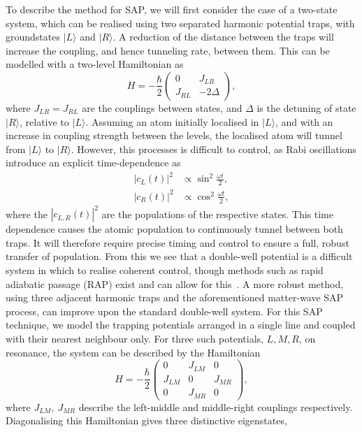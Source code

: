 To describe the method for SAP, we will first consider the case of a two-state system, which can be realised using two separated harmonic potential traps, with groundstates $| L \rangle$ and $| R \rangle$. A reduction of the distance between the traps will increase the coupling, and hence tunneling rate, between them. This can be modelled with a two-level Hamiltonian as
\begin{equation}
    H = -\frac{\hbar}{2}
    \begin{pmatrix}
        0 & J_{LR} \\
        J_{RL} & -2\Delta
    \end{pmatrix},
\end{equation}
where $J_{LR} = J_{RL}$ are the couplings between states, and $\Delta$ is the detuning of state $| R \rangle$, relative to $| L \rangle$. Assuming an atom initially localised in $| L \rangle$, and with an increase in coupling strength between the levels, the localised atom will tunnel from $| L \rangle$ to $| R \rangle $. However, this processes is difficult to control, as Rabi oscillations introduce an explicit time-dependence as
\begin{subequations}
\begin{align}
    |c_L(t)|^2 &\propto \sin^2 \frac{\omega t}{2} ,\\
    |c_R(t)|^2 &\propto \cos^2 \frac{\omega t}{2},
\end{align}
\end{subequations}
where the $|c_{L,R}(t)|^2$ are the populations of the respective states. This time dependence causes the atomic population to continuously tunnel between both traps. It will therefore require precise timing and control to ensure a full, robust transfer of population. From this we see that a double-well potential is a difficult system in which to realise coherent control, though methods such as rapid adiabatic passage (RAP) exist and can allow for this~\cite{AO:Vitanov_arpc_2001}. A more robust method, using three adjacent harmonic traps and the aforementioned matter-wave SAP process, can improve upon the standard double-well system. For this SAP technique, we model the trapping potentials arranged in a single line and coupled with their nearest neighbour only. For three such potentials, $L,M,R$, on resonance, the system can be described by the Hamiltonian
\begin{equation}\label{eqn:sap_ham}
    H = -\frac{\hbar}{2}
    \begin{pmatrix}
        0 & J_{LM} & 0 \\
        J_{LM} & 0 & J_{MR} \\
        0 & J_{MR} & 0
    \end{pmatrix},
\end{equation}
where $J_{LM},~J_{MR}$ describe the left-middle and middle-right couplings respectively. Diagonalising this Hamiltonian gives three distinctive eigenstates,

